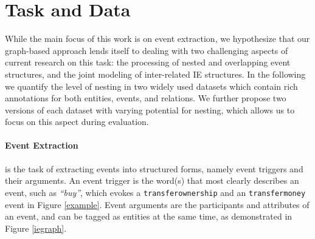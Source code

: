 \documentclass[11pt]{article}
\begin{document}
\section{Task and Data}
\label{sec:task-data}


While the main focus of this work is on event extraction, we hypothesize that our graph-based approach lends itself to dealing with two challenging aspects of current research on this task: the processing of nested and overlapping event structures, and the joint modeling of inter-related IE structures. In the following we quantify the level of nesting in two widely used datasets which contain rich annotations for both entities, events, and relations. We further propose two versions of each dataset with varying potential for nesting, which allows us to focus on this aspect during evaluation.

\paragraph{Event Extraction} is the task of extracting events into structured forms, namely event triggers and their arguments. An event trigger is the word(s) that most clearly describes an event, such as \textit{``buy''}, which evokes a \texttt{transferownership} and an \texttt{transfermoney} event in Figure \ref{example}. Event arguments are the participants and attributes of an event, and can be tagged as entities at the same time, as demonstrated in Figure \ref{iegraph}.
\end{document}
